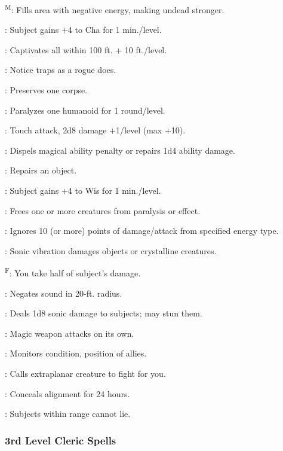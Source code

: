 \textsuperscript{M}: Fills area with negative energy, making undead stronger.

: Subject gains +4 to Cha for 1 min./level.

: Captivates all within 100 ft. + 10 ft./level.

: Notice traps as a rogue does.

: Preserves one corpse.

: Paralyzes one humanoid for 1 round/level.

: Touch attack, 2d8 damage +1/level (max +10).

: Dispels magical ability penalty or repairs 1d4 ability damage.

: Repairs an object.

: Subject gains +4 to Wis for 1 min./level.

: Frees one or more creatures from paralysis or  effect.

: Ignores 10 (or more) points of damage/attack from specified energy type.

: Sonic vibration damages objects or crystalline creatures.

\textsuperscript{F}: You take half of subject's damage.

: Negates sound in 20-ft. radius.

: Deals 1d8 sonic damage to subjects; may stun them.

: Magic weapon attacks on its own.

: Monitors condition, position of allies.

: Calls extraplanar creature to fight for you.

: Conceals alignment for 24 hours.

: Subjects within range cannot lie.

\subsubsection{3rd Level Cleric Spells}

